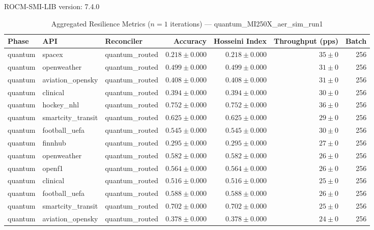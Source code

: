 ROCM-SMI-LIB version: 7.4.0

\begin{table}[htbp]
\caption{Aggregated Resilience Metrics ($n=1$ iterations) --- quantum_MI250X_aer_sim_run1}
\begin{tabular}{l l l r r r r}
\hline
Phase & API & Reconciler & Accuracy & Hosseini Index & Throughput (pps) & Batch \\
\hline
quantum & spacex & quantum\_routed & $0.218\pm0.000$ & $0.218\pm0.000$ & $35\pm0$ & 256 \\
quantum & openweather & quantum\_routed & $0.499\pm0.000$ & $0.499\pm0.000$ & $31\pm0$ & 256 \\
quantum & aviation\_opensky & quantum\_routed & $0.408\pm0.000$ & $0.408\pm0.000$ & $31\pm0$ & 256 \\
quantum & clinical & quantum\_routed & $0.394\pm0.000$ & $0.394\pm0.000$ & $30\pm0$ & 256 \\
quantum & hockey\_nhl & quantum\_routed & $0.752\pm0.000$ & $0.752\pm0.000$ & $36\pm0$ & 256 \\
quantum & smartcity\_transit & quantum\_routed & $0.625\pm0.000$ & $0.625\pm0.000$ & $29\pm0$ & 256 \\
quantum & football\_uefa & quantum\_routed & $0.545\pm0.000$ & $0.545\pm0.000$ & $30\pm0$ & 256 \\
quantum & finnhub & quantum\_routed & $0.295\pm0.000$ & $0.295\pm0.000$ & $27\pm0$ & 256 \\
quantum & openweather & quantum\_routed & $0.582\pm0.000$ & $0.582\pm0.000$ & $26\pm0$ & 256 \\
quantum & openf1 & quantum\_routed & $0.564\pm0.000$ & $0.564\pm0.000$ & $26\pm0$ & 256 \\
quantum & clinical & quantum\_routed & $0.516\pm0.000$ & $0.516\pm0.000$ & $25\pm0$ & 256 \\
quantum & football\_uefa & quantum\_routed & $0.588\pm0.000$ & $0.588\pm0.000$ & $26\pm0$ & 256 \\
quantum & smartcity\_transit & quantum\_routed & $0.702\pm0.000$ & $0.702\pm0.000$ & $25\pm0$ & 256 \\
quantum & aviation\_opensky & quantum\_routed & $0.378\pm0.000$ & $0.378\pm0.000$ & $24\pm0$ & 256 \\

\end{tabular}
\end{table}

